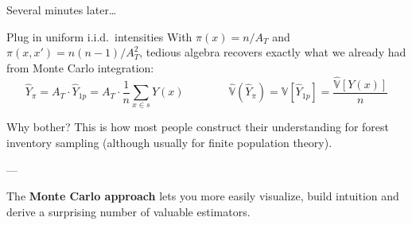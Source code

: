 \documentclass[
  ignorenonframetext,
  aspectratio=169,
]{beamer}
\begin{document}
\begin{frame}{Several minutes later\ldots{}}
\label{several-minutes-later}
\begin{block}{Plug in uniform i.i.d.\ intensities}
With $\pi(x) = n/A_T$ and $\pi(x,x') = n(n-1)/A_T^2$, tedious algebra recovers exactly what we already had from Monte Carlo integration:
\[
\hat Y_\pi = A_T \cdot \hat Y_{1p} = A_T \cdot \frac{1}{n}\sum_{x \in s} Y(x)
\qquad\qquad
\hat{\mathbb{V}}(\hat Y_\pi) = \hat{\mathbb{V}}[\hat Y_{1p}] = \frac{\hat{\mathbb{V}}[Y(x)]}{n}
\]
\end{block}

\pause

\begin{block}{Why bother?}
This is how most people construct their understanding for forest inventory sampling (although usually for finite population theory). 

---

The \textbf{Monte Carlo approach} lets you more easily visualize, build intuition and derive a surprising number of valuable estimators.
\end{block}
\end{frame}
\end{document}

